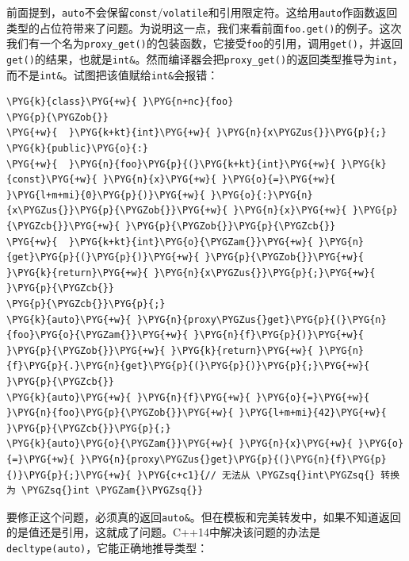 
前面提到，\texttt{auto}不会保留\texttt{const}/\texttt{volatile}和引用限定符。这给用\texttt{auto}作函数返回类型的占位符带来了问题。为说明这一点，我们来看前面\texttt{foo.\allowbreak{}get()}的例子。这次我们有一个名为\texttt{proxy\_\allowbreak{}get()}的包装函数，它接受\texttt{foo}的引用，调用\texttt{get()}，并返回\texttt{get()}的结果，也就是\texttt{int\&}。然而编译器会把\texttt{proxy\_\allowbreak{}get()}的返回类型推导为\texttt{int}，而不是\texttt{int\&}。试图把该值赋给\texttt{int\&}会报错：



\begin{codeblockbg}
\begin{Verbatim}[commandchars=\\\{\},breaklines=true,breakanywhere=true,fontsize=\codefont,xleftmargin=17bp]
\PYG{k}{class}\PYG{+w}{ }\PYG{n+nc}{foo}
\PYG{p}{\PYGZob{}}
\PYG{+w}{  }\PYG{k+kt}{int}\PYG{+w}{ }\PYG{n}{x\PYGZus{}}\PYG{p}{;}
\PYG{k}{public}\PYG{o}{:}
\PYG{+w}{  }\PYG{n}{foo}\PYG{p}{(}\PYG{k+kt}{int}\PYG{+w}{ }\PYG{k}{const}\PYG{+w}{ }\PYG{n}{x}\PYG{+w}{ }\PYG{o}{=}\PYG{+w}{ }\PYG{l+m+mi}{0}\PYG{p}{)}\PYG{+w}{ }\PYG{o}{:}\PYG{n}{x\PYGZus{}}\PYG{p}{\PYGZob{}}\PYG{+w}{ }\PYG{n}{x}\PYG{+w}{ }\PYG{p}{\PYGZcb{}}\PYG{+w}{ }\PYG{p}{\PYGZob{}}\PYG{p}{\PYGZcb{}}
\PYG{+w}{  }\PYG{k+kt}{int}\PYG{o}{\PYGZam{}}\PYG{+w}{ }\PYG{n}{get}\PYG{p}{(}\PYG{p}{)}\PYG{+w}{ }\PYG{p}{\PYGZob{}}\PYG{+w}{ }\PYG{k}{return}\PYG{+w}{ }\PYG{n}{x\PYGZus{}}\PYG{p}{;}\PYG{+w}{ }\PYG{p}{\PYGZcb{}}
\PYG{p}{\PYGZcb{}}\PYG{p}{;}
\PYG{k}{auto}\PYG{+w}{ }\PYG{n}{proxy\PYGZus{}get}\PYG{p}{(}\PYG{n}{foo}\PYG{o}{\PYGZam{}}\PYG{+w}{ }\PYG{n}{f}\PYG{p}{)}\PYG{+w}{ }\PYG{p}{\PYGZob{}}\PYG{+w}{ }\PYG{k}{return}\PYG{+w}{ }\PYG{n}{f}\PYG{p}{.}\PYG{n}{get}\PYG{p}{(}\PYG{p}{)}\PYG{p}{;}\PYG{+w}{ }\PYG{p}{\PYGZcb{}}
\PYG{k}{auto}\PYG{+w}{ }\PYG{n}{f}\PYG{+w}{ }\PYG{o}{=}\PYG{+w}{ }\PYG{n}{foo}\PYG{p}{\PYGZob{}}\PYG{+w}{ }\PYG{l+m+mi}{42}\PYG{+w}{ }\PYG{p}{\PYGZcb{}}\PYG{p}{;}
\PYG{k}{auto}\PYG{o}{\PYGZam{}}\PYG{+w}{ }\PYG{n}{x}\PYG{+w}{ }\PYG{o}{=}\PYG{+w}{ }\PYG{n}{proxy\PYGZus{}get}\PYG{p}{(}\PYG{n}{f}\PYG{p}{)}\PYG{p}{;}\PYG{+w}{ }\PYG{c+c1}{// 无法从 \PYGZsq{}int\PYGZsq{} 转换为 \PYGZsq{}int \PYGZam{}\PYGZsq{}}
\end{Verbatim}
\end{codeblockbg}



要修正这个问题，必须真的返回\texttt{auto\&}。但在模板和完美转发中，如果不知道返回的是值还是引用，这就成了问题。C++14中解决该问题的办法是\texttt{decltype(\allowbreak{}auto)}，它能正确地推导类型：



